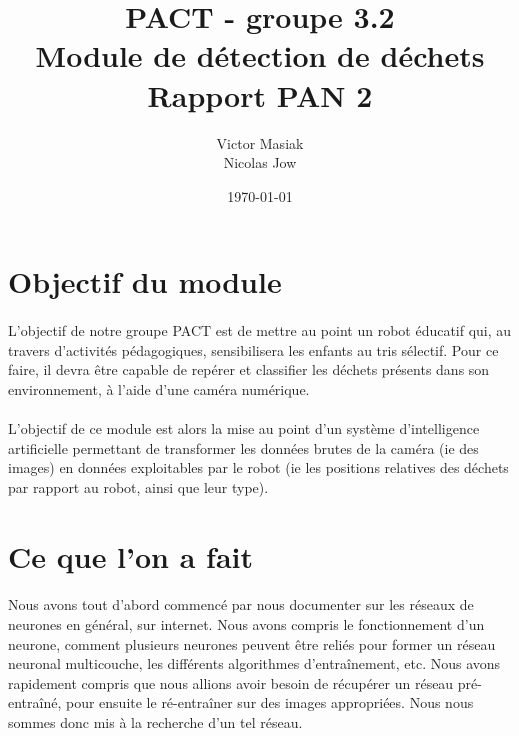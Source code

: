 \documentclass[11pt,a4paper,twocolumn]{article}
\begin{document}
\title{PACT - groupe 3.2\\Module de détection de déchets\\Rapport PAN 2}
\author{Victor Masiak\\ Nicolas Jow}
\date{\today}

\maketitle

\section{Objectif du module}

\paragraph*{}

L'objectif de notre groupe PACT est de mettre au point un robot éducatif qui, au travers d'activités pédagogiques, sensibilisera les enfants au tris sélectif. Pour ce faire, il devra être capable de repérer et classifier les déchets présents dans son environnement, à l’aide d’une caméra numérique.

\paragraph*{}

L’objectif de ce module est alors la mise au point d’un système d’intelligence artificielle permettant de transformer les données brutes de la caméra (ie des images) en données exploitables par le robot (ie les positions relatives des déchets par rapport au robot, ainsi que leur type).


\section{Ce que l'on a fait}

\paragraph*{}

Nous avons tout d’abord commencé par nous documenter sur les réseaux de neurones en général, sur internet. Nous avons compris le fonctionnement d’un neurone, comment plusieurs neurones peuvent être reliés pour former un réseau neuronal multicouche, les différents algorithmes d'entraînement, etc.
Nous avons rapidement compris que nous allions avoir besoin de récupérer un réseau pré-entraîné, pour ensuite le ré-entraîner sur des images appropriées. Nous nous sommes donc mis à la recherche d’un tel réseau.
\end{document}
